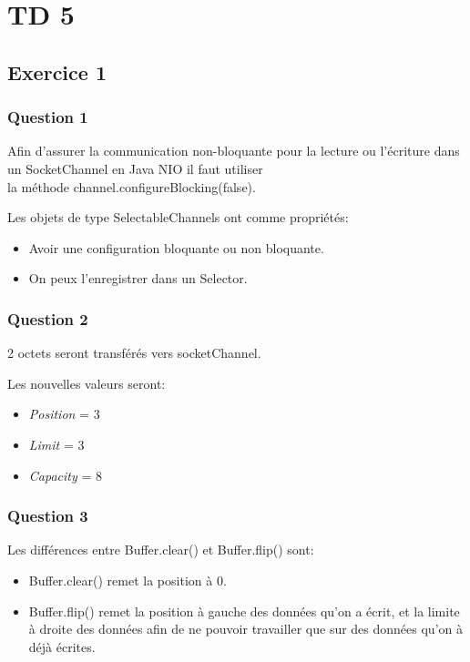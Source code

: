 \section{TD 5}

\subsection{Exercice 1}

\subsubsection{Question 1}

Afin d'assurer la communication non-bloquante pour la
lecture ou l'\'ecriture dans un SocketChannel en Java NIO
il faut utiliser\\ la m\'ethode
channel.configureBlocking(false).

Les objets de type SelectableChannels ont comme
propri\'et\'es:
\begin{itemize}
  \item Avoir une configuration bloquante ou non bloquante.
  \item On peux l'enregistrer dans un Selector.
\end{itemize}


\subsubsection{Question 2}

2 octets seront transf\'er\'es vers socketChannel.

Les nouvelles valeurs seront:
\begin{itemize}
  \item \emph{Position} = 3
  \item \emph{Limit} = 3
  \item \emph{Capacity} = 8
\end{itemize}


\subsubsection{Question 3}

Les diff\'erences entre Buffer.clear() et Buffer.flip() sont:
\begin{itemize}
  \item Buffer.clear() remet la position \`a 0.
  \item Buffer.flip() remet la position \`a gauche des
  donn\'ees qu'on a \'ecrit, et la limite \`a droite des
  donn\'ees afin de ne pouvoir travailler que sur des
  donn\'ees qu'on \`a d\'ej\`a \'ecrites.
\end{itemize}


